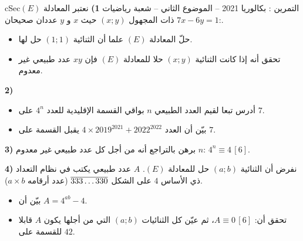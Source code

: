 \documentclass[12pt,a4paper]{article}
\newenvironment{BOX}[2]{\begin{otherlanguage}{english}\begin{arbox}{#1}{#2}}{\end{arbox}\end{otherlanguage}}
\newcounter{exo}
\newenvironment{tamrin}[1]{\stepcounter{exo}\begin{BOX}{cSec}{التمرين \theexo: #1}}{\end{BOX}}
\renewcommand{\ldots}{\mathinner{\ldotp\ldotp\ldotp}}
\newenvironment{sq}{\begin{itemize}[leftmargin=2.4em,itemsep=3pt]}{\end{itemize}}
\newcommand{\qa}{\item[(أ)]}\newcommand{\qb}{\item[(ب)]}\newcommand{\qc}{\item[(جـ)]}\newcommand{\qd}{\item[(د)]}\newcommand{\qe}{\item[(هـ)]}
\begin{document}
\begin{tamrin}{بكالوريا 2021 -- الموضوع الثاني -- شعبة رياضيات}
\textbf{1)} نعتبر المعادلة $(E)$:\quad $7x-6y=1$ ذات المجهول $(x;y)$ حيث $x$ و $y$ عددان صحيحان.
\begin{sq}
\qa حلّ المعادلة $(E)$ علما أن الثنائية $(1;1)$ حل لها.
\qb تحقق أنه إذا كانت الثنائية $(x;y)$ حلا للمعادلة $(E)$ فإن $xy$ عدد طبيعي غير معدوم.
\end{sq}
\textbf{2)}
\begin{sq}
\qa أدرس تبعا لقيم العدد الطبيعي $n$ بواقي القسمة الإقليدية للعدد $4^n$ على $7$.
\qb بيّن أن العدد $4\times2019^{2021}+2022^{2022}$ يقبل القسمة على $7$.
\end{sq}
\textbf{3)} برهن بالتراجع أنه من أجل كل عدد طبيعي غير معدوم $n$: $4^n\equiv4\,[6]$.

\textbf{4)} نفرض أن الثنائية $(a;b)$ حل للمعادلة $(E)$.
$A$ عدد طبيعي يكتب في نظام التعداد ذي الأساس $4$ على الشكل $\overline{333\ldots330}$ (عدد أرقامه $a\times b$).
\begin{sq}
\qa بيّن أن $A=4^{ab}-4$.
\qb تحقق أن: $A\equiv0\,[6]$، ثم عيّن كل الثنائيات $(a;b)$ التي من أجلها يكون $A$ قابلا للقسمة على $42$.
\end{sq}
\end{tamrin}
\end{document}
